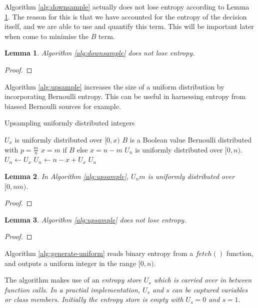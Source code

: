 \documentclass[12pt]{article}
\newtheorem{lemma}{Lemma}
\begin{document}
Algorithm \ref{alg:downsample} actually does not lose entropy according to Lemma \ref{lem:downsample}. The reason for this is that we have accounted for the entropy of the decision itself, and we are able to use and quantify this term. This will be important later when come to minimise the $B$ term.

\begin{lemma}
\label{lem:downsample}
Algorithm \ref{alg:downsample} does not lose entropy.
\end{lemma}

\begin{proof}
\end{proof}

Algorithm \ref{alg:upsample} increases the size of a uniform distribution by incorporating Bernoulli entropy. This can be useful in harnessing entropy from biassed Bernoulli sources for example.

\begin{algorithm}
\caption{Upsampling uniformly distributed integers}
\label{alg:upsample}
\begin{algorithmic}[1]
\Require $U_x$ is uniformly distributed over $[0,x)$
\Require $B$ is a Boolean value Bernoulli distributed with $p=\frac{m}{n}$
\Require $x=m$ if $B$ else $x=n-m$
\Ensure $U_n$ is uniformly distributed over $[0,n)$.
    \State $U_n \gets U_x$  
  \Else
    \State $U_n \gets n-x+U_x$  
  \EndIf
  \State \Return $U_n$
\EndProcedure
\end{algorithmic}
\end{algorithm}

\begin{lemma}
In Algorithm \ref{alg:upsample}, $U_nm$ is uniformly distributed over $[0,nm)$.
\end{lemma}

\begin{proof}
\end{proof}


\begin{lemma}
Algorithm \ref{alg:upsample} does not lose entropy.
\end{lemma}

\begin{proof}
\end{proof}

Algorithm \ref{alg:generate-uniform} reads binary entropy from a $fetch()$ function, and outputs a uniform integer in the range $[0,n)$. 

The algorithm makes use of an \em entropy store \em $U_s$ which is carried over in between function calls. In a practial implementation, $U_s$ and $s$ can be captured variables or class members. Initially the entropy store is empty with $U_s = 0$ and $s=1$.
\end{document}

